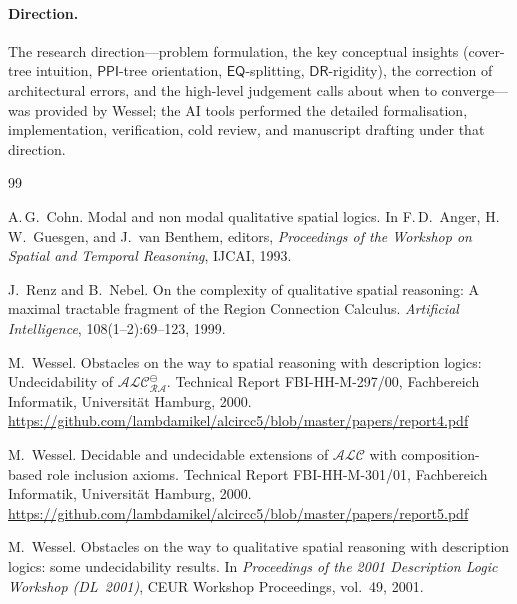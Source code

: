 \documentclass[
]{ceurart}
\theoremstyle{definition}
\newcommand{\ALC}{\ensuremath{\mathcal{ALC}}}
\newcommand{\DR}{\ensuremath{\mathsf{DR}}}
\newcommand{\EQ}{\ensuremath{\mathsf{EQ}}}
\newcommand{\PPI}{\ensuremath{\mathsf{PPI}}}
\begin{document}
\paragraph{Direction.}  The research direction---problem
formulation, the key conceptual insights (cover-tree intuition,
$\PPI$-tree orientation, $\EQ$-splitting, $\DR$-rigidity), the
correction of architectural errors, and the high-level judgement
calls about when to converge---was provided by Wessel; the AI
tools performed the detailed formalisation, implementation,
verification, cold review, and manuscript drafting under that
direction.

\begin{thebibliography}{99}


A.\,G.\ Cohn.
\newblock Modal and non modal qualitative spatial logics.
\newblock In F.\,D.\ Anger, H.\,W.\ Guesgen, and J.\ van Benthem, editors,
  \emph{Proceedings of the Workshop on Spatial and Temporal Reasoning},
  IJCAI, 1993.

J.\ Renz and B.\ Nebel.
\newblock On the complexity of qualitative spatial reasoning:
  A maximal tractable fragment of the Region Connection Calculus.
\newblock \emph{Artificial Intelligence}, 108(1--2):69--123, 1999.

M.\ Wessel.
\newblock Obstacles on the way to spatial reasoning with description
  logics: Undecidability of $\ALC_{\mathcal{RA}}^\ominus$.
\newblock Technical Report FBI-HH-M-297/00, Fachbereich Informatik,
  Universit\"at Hamburg, 2000.
\newblock \url{https://github.com/lambdamikel/alcircc5/blob/master/papers/report4.pdf}

M.\ Wessel.
\newblock Decidable and undecidable extensions of $\ALC$ with
  composition-based role inclusion axioms.
\newblock Technical Report FBI-HH-M-301/01, Fachbereich Informatik,
  Universit\"at Hamburg, 2000.
\newblock \url{https://github.com/lambdamikel/alcircc5/blob/master/papers/report5.pdf}

M.\ Wessel.
\newblock Obstacles on the way to qualitative spatial reasoning with
  description logics: some undecidability results.
\newblock In \emph{Proceedings of the 2001 Description Logic Workshop
  (DL~2001)}, CEUR Workshop Proceedings, vol.~49, 2001.


\end{thebibliography}
\end{document}
